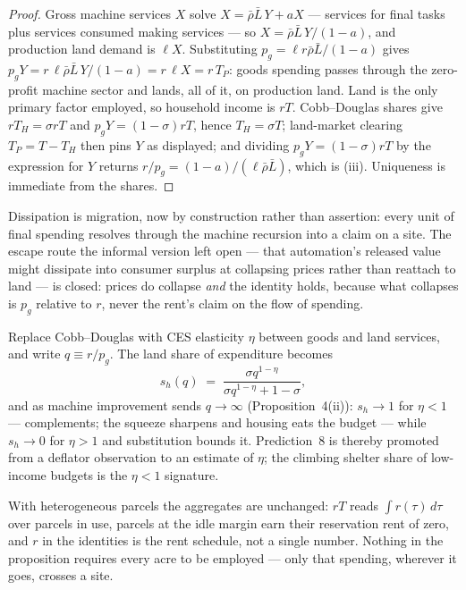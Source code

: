 \begin{proof}
Gross machine services $X$ solve $X = \bar\rho\bar L\,Y + aX$ --- services for
final tasks plus services consumed making services --- so
$X = \bar\rho\bar L\,Y/(1-a)$, and production land demand is $\ell X$.
Substituting $p_g = \ell r\bar\rho\bar L/(1-a)$ gives
$p_g Y = r\,\ell\bar\rho\bar L\,Y/(1-a) = r\,\ell X = r\,T_P$: goods spending
passes through the zero-profit machine sector and lands, all of it, on
production land. Land is the only primary factor employed, so household income
is $rT$. Cobb--Douglas shares give $rT_H = \sigma rT$ and
$p_g Y = (1-\sigma)rT$, hence $T_H = \sigma T$; land-market clearing
$T_P = T - T_H$ then pins $Y$ as displayed; and dividing
$p_g Y = (1-\sigma)rT$ by the expression for $Y$ returns
$r/p_g = (1-a)/(\ell\bar\rho\bar L)$, which is (iii). Uniqueness is immediate
from the shares.
\end{proof}

Dissipation is migration, now by construction rather than assertion: every
unit of final spending resolves through the machine recursion into a claim on
a site. The escape route the informal version left open --- that automation's
released value might dissipate into consumer surplus at collapsing prices
rather than reattach to land --- is closed: prices do collapse \emph{and} the
identity holds, because what collapses is $p_g$ relative to $r$, never the
rent's claim on the flow of spending.

\begin{remark}
Replace Cobb--Douglas with CES elasticity $\eta$ between goods and land
services, and write $q \equiv r/p_g$. The land share of expenditure becomes
\[
s_h(q) \;=\; \frac{\sigma q^{1-\eta}}{\sigma q^{1-\eta} + 1 - \sigma},
\]
and as machine improvement sends $q \to \infty$ (Proposition~4(ii)):
$s_h \to 1$ for $\eta < 1$ --- complements; the squeeze sharpens and housing
eats the budget --- while $s_h \to 0$ for $\eta > 1$ and substitution bounds
it. Prediction~8 is thereby promoted from a deflator observation to an
estimate of $\eta$; the climbing shelter share of low-income budgets is the
$\eta < 1$ signature.
\end{remark}

\begin{remark}
With heterogeneous parcels the aggregates are unchanged: $rT$ reads
$\int r(\tau)\,d\tau$ over parcels in use, parcels at the idle margin earn
their reservation rent of zero, and $r$ in the identities is the rent
schedule, not a single number. Nothing in the proposition requires every acre
to be employed --- only that spending, wherever it goes, crosses a site.
\end{remark}

